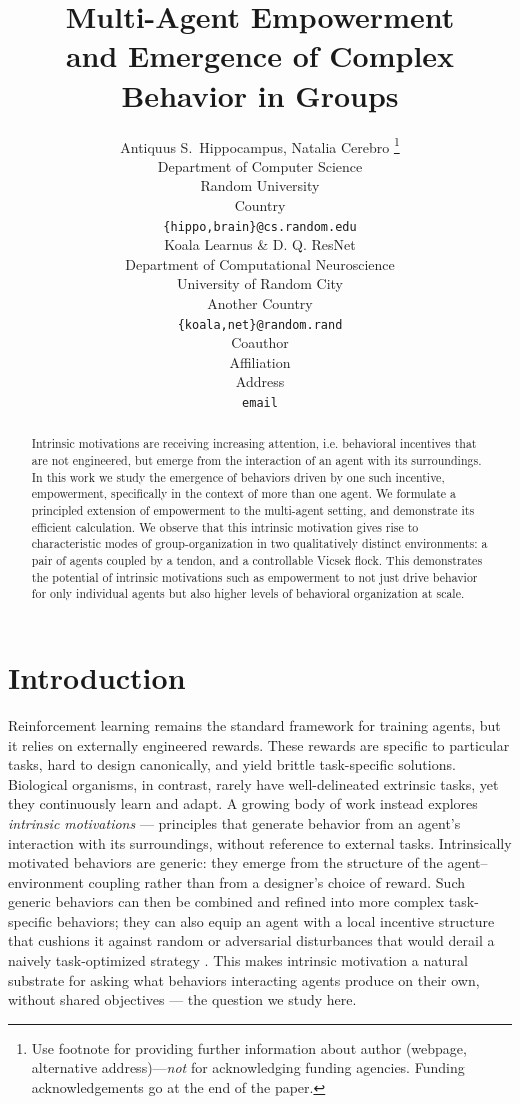 \documentclass{article} %
\title{
Multi-Agent Empowerment \\ and Emergence of Complex Behavior in Groups
}
\author{Antiquus S.~Hippocampus, Natalia Cerebro  \thanks{ Use footnote for providing further information
about author (webpage, alternative address)---\emph{not} for acknowledging
funding agencies.  Funding acknowledgements go at the end of the paper.} \\
Department of Computer Science\\
Random University\\
Country \\
\texttt{\{hippo,brain\}@cs.random.edu} \\
\And %
Koala Learnus \& D. Q. ResNet  \\
Department of Computational Neuroscience \\
University of Random City \\
Another Country \\
\texttt{\{koala,net\}@random.rand} \\
\AND %
Coauthor \\
Affiliation \\
Address \\
\texttt{email}
}
\begin{document}
\maketitle

\begin{abstract}
  Intrinsic motivations are receiving increasing attention, i.e. behavioral incentives that are not engineered, but emerge from the interaction of an agent with its surroundings. In this work we study the emergence of behaviors driven by one such incentive, empowerment, specifically in the context of more than one agent. We formulate a principled extension of empowerment to the multi-agent setting, and demonstrate its efficient calculation. We observe that this intrinsic motivation gives rise to characteristic modes of group-organization in two qualitatively distinct environments: a pair of agents coupled by a tendon, and a controllable Vicsek flock. This demonstrates the potential of intrinsic motivations such as empowerment to not just drive behavior for only individual agents but also higher levels of behavioral organization at scale.
\end{abstract}

\section{Introduction}



Reinforcement learning remains the standard framework for training agents, but it relies on externally engineered rewards. These rewards are specific to particular tasks, hard to design canonically, and yield brittle task-specific solutions. Biological organisms, in contrast, rarely have well-delineated extrinsic tasks, yet they continuously learn and adapt. A growing body of work instead explores \emph{intrinsic motivations} \citep{tiomkin_2024} --- principles that generate behavior from an agent's interaction with its surroundings, without reference to external tasks. Intrinsically motivated behaviors are generic: they emerge from the structure of the agent--environment coupling rather than from a designer's choice of reward. Such generic behaviors can then be combined and refined into more complex task-specific behaviors; they can also equip an agent with a local incentive structure that cushions it against random or adversarial disturbances that would derail a naively task-optimized strategy \citep{tiomkin2025process}. This makes intrinsic motivation a natural substrate for asking what behaviors interacting agents produce on their own, without shared objectives --- the question we study here.
\end{document}
